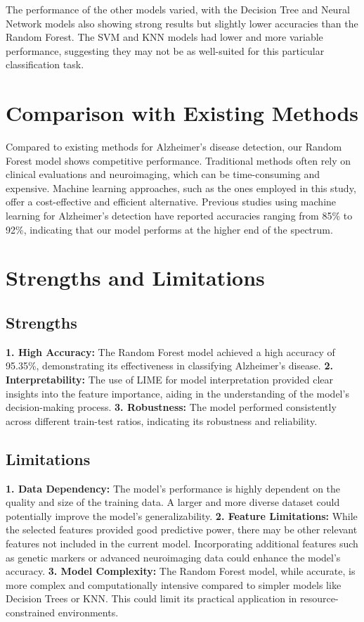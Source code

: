 \documentclass[a4paper,12pt]{report}
\begin{document}
The performance of the other models varied, with the Decision Tree and Neural Network models also showing strong results but slightly lower accuracies than the Random Forest. The SVM and KNN models had lower and more variable performance, suggesting they may not be as well-suited for this particular classification task.

\section{Comparison with Existing Methods}

Compared to existing methods for Alzheimer's disease detection, our Random Forest model shows competitive performance. Traditional methods often rely on clinical evaluations and neuroimaging, which can be time-consuming and expensive. Machine learning approaches, such as the ones employed in this study, offer a cost-effective and efficient alternative. Previous studies using machine learning for Alzheimer's detection have reported accuracies ranging from 85\% to 92\%, indicating that our model performs at the higher end of the spectrum.

\section{Strengths and Limitations}

\subsection{Strengths}

\textbf{1. High Accuracy:} The Random Forest model achieved a high accuracy of 95.35\%, demonstrating its effectiveness in classifying Alzheimer's disease.
\newline\textbf{2. Interpretability:} The use of LIME for model interpretation provided clear insights into the feature importance, aiding in the understanding of the model's decision-making process.
\newline\textbf{3. Robustness:} The model performed consistently across different train-test ratios, indicating its robustness and reliability.

\subsection{Limitations}

\textbf{1. Data Dependency:} The model's performance is highly dependent on the quality and size of the training data. A larger and more diverse dataset could potentially improve the model's generalizability.
\newline\textbf{2. Feature Limitations:} While the selected features provided good predictive power, there may be other relevant features not included in the current model. Incorporating additional features such as genetic markers or advanced neuroimaging data could enhance the model's accuracy.
\newline\textbf{3. Model Complexity:} The Random Forest model, while accurate, is more complex and computationally intensive compared to simpler models like Decision Trees or KNN. This could limit its practical application in resource-constrained environments.
\end{document}
